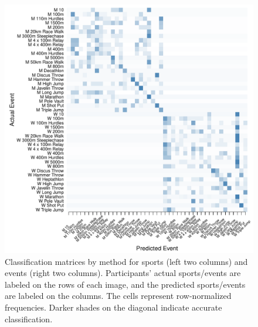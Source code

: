 \begin{figure}
\begin{center}
\begin{minipage}{0.20\textwidth}
\begin{center}
    \end{center}
  \end{minipage}
  \hspace{0.05\textwidth}
  \begin{minipage}{0.20\textwidth}
    \begin{center}
      \includegraphics[scale=0.20]{../graphics/athletesANN-tst.pdf}
    \end{center}
  \end{minipage}

  \end{center}

\caption{Classification matrices by method for sports (left two columns) and events (right two columns). Participants' actual sports/events are labeled on the rows of each image, and the predicted sports/events are labeled on the columns. The cells represent row-normalized frequencies. Darker shades on the diagonal indicate accurate classification.}
\label{matrices}
\end{figure}